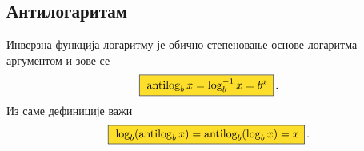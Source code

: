 \subsection{Антилогаритам}

\def\antilog{\mathop{\rm antilog}\nolimits}
Инверзна функција логаритму
је обично степеновање основе логаритма аргументом и зове се {\sl{}}
\vskip-9pt
\begin{equation}
\okvir{\antilog_b x = \logb^{-1}x =  b^x}.
\end{equation}
Из саме дефиниције важи
\begin{equation}
\okvir{\log_b(\antilog_b x)=\antilog_b(\log_b x)=x}.
\end{equation}
